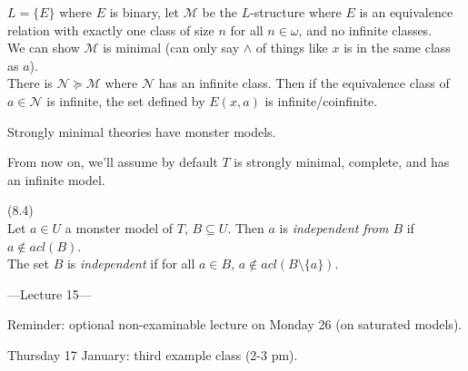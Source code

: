 \documentclass[a4paper]{article}
\begin{document}
\begin{eg}
    $L=\{E\}$ where $E$ is binary, let $\mathcal{M}$ be the $L$-structure where $E$ is an equivalence relation with exactly one class of size $n$ for all $n \in \omega$, and no infinite classes.\\
    We can show $\mathcal{M}$ is minimal (can only say $\wedge$ of things like $x$ is in the same class as $a$).\\
    There is $\mathcal{N} \succcurlyeq \mathcal{M}$ where $\mathcal{N}$ has an infinite class. Then if the equivalence class of $a \in \mathcal{N}$ is infinite, the set defined by $E(x,a)$ is infinite/coinfinite.
\end{eg}

\begin{rem}
    Strongly minimal theories have monster models.
\end{rem}

From now on, we'll assume by default $T$ is strongly minimal, complete, and has an infinite model.

\begin{defi} (8.4)\\
    Let $a \in U$ a monster model of $T$, $B \subseteq U$. Then $a$ is \emph{independent from $B$} if $a \not\in acl(B)$.\\
    The set $B$ is \emph{independent} if for all $a \in B$, $a \not\in acl(B\setminus\{a\})$.
\end{defi}

---Lecture 15---

Reminder: optional non-examinable lecture on Monday 26 (on saturated models).

Thursday 17 January: third example class (2-3 pm).
\end{document}

